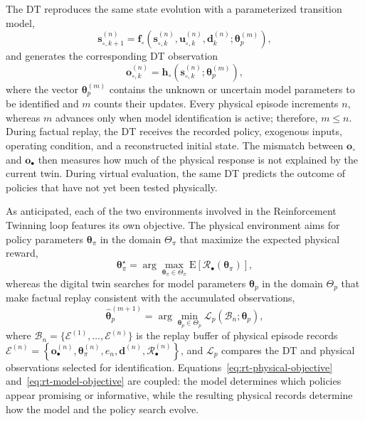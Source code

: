 \documentclass[journal]{IEEEtran}
\begin{document}
The DT reproduces the same state evolution with a parameterized transition model,
\begin{equation}
\mathbf s_{\circ,k+1}^{(n)}=
\mathbf f_{\circ}\!\left(
\mathbf s_{\circ,k}^{(n)},
\mathbf u_{\circ,k}^{(n)},
\mathbf d_k^{(n)};
\boldsymbol{\theta}_{p}^{(m)}
\right),
\label{eq:rt-digital-state}
\end{equation}
and generates the corresponding DT observation
\begin{equation}
\mathbf o_{\circ,k}^{(n)}=
\mathbf h_{\circ}\!\left(
\mathbf s_{\circ,k}^{(n)};
\boldsymbol{\theta}_{p}^{(m)}
\right),
\label{eq:rt-digital-observation}
\end{equation}
where the vector $\boldsymbol{\theta}_{p}^{(m)}$ contains the unknown or uncertain model parameters to be identified and $m$ counts their updates. Every physical episode increments $n$, whereas $m$ advances only when model identification is active; therefore, $m \le n$. During factual replay, the DT receives the recorded policy, exogenous inputs, operating condition, and a reconstructed initial state. The mismatch between $\mathbf o_{\circ}$ and $\mathbf o_{\bullet}$
then measures how much of the physical response is not explained by the current twin. During virtual evaluation, the same DT predicts the outcome of policies that have not yet been tested physically.

As anticipated, each of the two environments involved in the Reinforcement Twinning loop features its own objective. The physical environment aims for policy parameters $\boldsymbol{\theta}_{\pi}$ in the domain $\Theta_{\pi}$ that maximize the expected physical reward,
\begin{equation}
\boldsymbol{\theta}_{\pi}^{\star}
=\arg\max_{\boldsymbol{\theta}_{\pi}\in\Theta_{\pi}}
\mathrm{E}\!\left[\mathcal R_{\bullet}
(\boldsymbol{\theta}_{\pi})\right],
\label{eq:rt-physical-objective}
\end{equation}
whereas the digital twin searches for model parameters $\boldsymbol{\theta}_{p}$  in the domain $\Theta_{p}$ that make factual replay consistent with the accumulated observations,
\begin{equation}
\widehat{\boldsymbol{\theta}}_{p}^{(m+1)}
=\arg\min_{\boldsymbol{\theta}_{p}\in\Theta_p}
\mathcal L_p\!\left(
\mathcal B_n;\boldsymbol{\theta}_{p}
\right),
\label{eq:rt-model-objective}
\end{equation}
where $\mathcal B_n=\{\mathcal E^{(1)},\ldots,\mathcal E^{(n)}\}$ is the replay buffer of physical episode records
$
\mathcal{E}^{(n)} = \left\{
\boldsymbol{o}_{\bullet}^{(n)},
\boldsymbol{\theta}_{\pi}^{(n)},
e_n,
\mathbf d^{(n)},
\mathcal{R}_{\bullet}^{(n)}
\right\}$,
and $\mathcal{L}_p$ compares the DT and physical observations selected for identification. Equations~\eqref{eq:rt-physical-objective} and~\eqref{eq:rt-model-objective} are coupled: the model determines which policies appear promising or informative, while the resulting physical records determine how the model and the policy search evolve.
\end{document}
